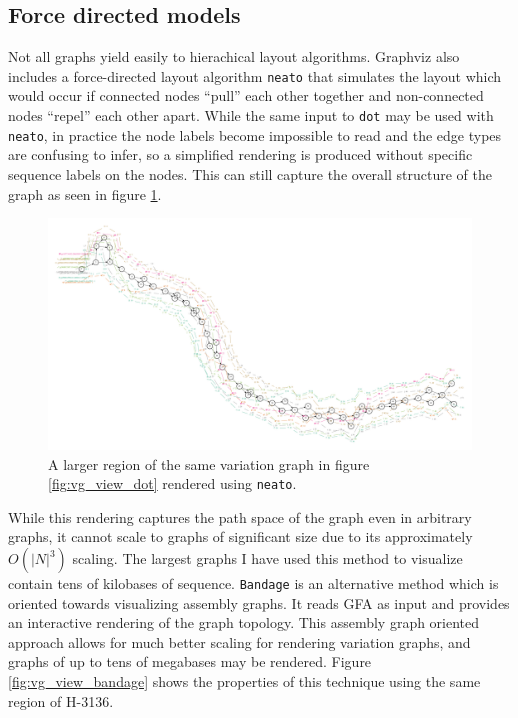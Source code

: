 \subsection{Force directed models}

Not all graphs yield easily to hierachical layout algorithms.
Graphviz also includes a force-directed layout algorithm {\tt neato} that simulates the layout which would occur if connected nodes ``pull'' each other together and non-connected nodes ``repel'' each other apart.
While the same input to {\tt dot} may be used with {\tt neato}, in practice the node labels become impossible to read and the edge types are confusing to infer, so a simplified rendering is produced without specific sequence labels on the nodes.
This can still capture the overall structure of the graph as seen in figure \ref{fig:vg_view_neato}.

\begin{figure}[htbp!] 
\centering    
\includegraphics[width=1.0\textwidth]{Chapter2/Figs/Vector/vg_view_dpS_H-3136_neato.pdf}
\caption[Force-directed layout with Graphviz's {\tt neato}]{A larger region of the same variation graph in figure \ref{fig:vg_view_dot} rendered using {\tt neato}.}
\label{fig:vg_view_neato}
\end{figure}

While this rendering captures the path space of the graph even in arbitrary graphs, it cannot scale to graphs of significant size due to its approximately $O(|N|^3)$ scaling.
The largest graphs I have used this method to visualize contain tens of kilobases of sequence.
{\tt Bandage} \cite{wick2015bandage} is an alternative method which is oriented towards visualizing assembly graphs.
It reads GFA as input and provides an interactive rendering of the graph topology.
This assembly graph oriented approach allows for much better scaling for rendering variation graphs, and graphs of up to tens of megabases may be rendered.
Figure \ref{fig:vg_view_bandage} shows the properties of this technique using the same region of H-3136.

